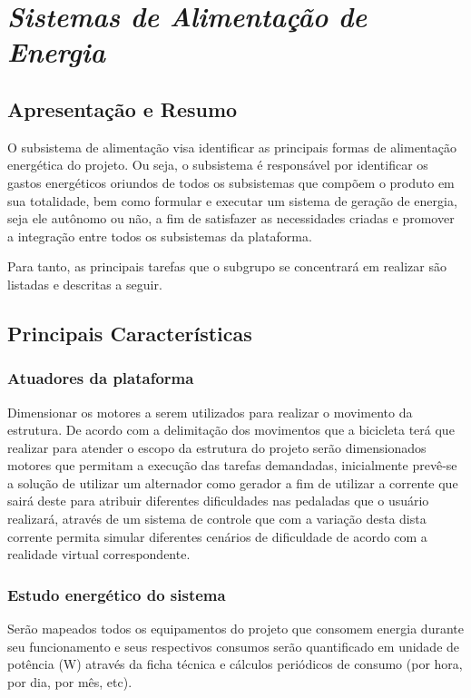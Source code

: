 \section{\textit{Sistemas de Alimentação de Energia }}
\subsection{Apresentação e Resumo}
O subsistema de alimentação visa identificar as principais formas de alimentação energética do projeto. Ou seja, o subsistema é responsável por identificar os gastos energéticos oriundos de todos os subsistemas que compõem o produto em sua totalidade, bem como formular e executar um sistema de geração de energia, seja ele autônomo ou não,  a fim de satisfazer as necessidades criadas e promover a integração entre todos os subsistemas da plataforma.  

Para tanto, as principais tarefas que o subgrupo se concentrará em realizar são listadas e descritas a seguir.

\subsection{Principais Características}
\subsubsection{Atuadores da plataforma}
	Dimensionar os motores a serem utilizados para realizar o movimento da estrutura. De acordo com a delimitação dos movimentos que a bicicleta terá que realizar para atender o escopo da estrutura do projeto serão dimensionados motores que permitam a execução das tarefas demandadas, inicialmente prevê-se a solução de utilizar um alternador como gerador a fim de utilizar a corrente que sairá deste para atribuir diferentes dificuldades nas pedaladas que o usuário realizará, através de um sistema de controle que com a variação desta dista corrente permita simular diferentes cenários de dificuldade de acordo com a realidade virtual correspondente. 	

\subsubsection{Estudo energético do sistema}
Serão mapeados todos os equipamentos do projeto que consomem energia durante seu funcionamento e seus respectivos consumos serão quantificado em unidade de potência (W) através da ficha técnica e cálculos periódicos de consumo (por hora, por dia, por mês, etc).

